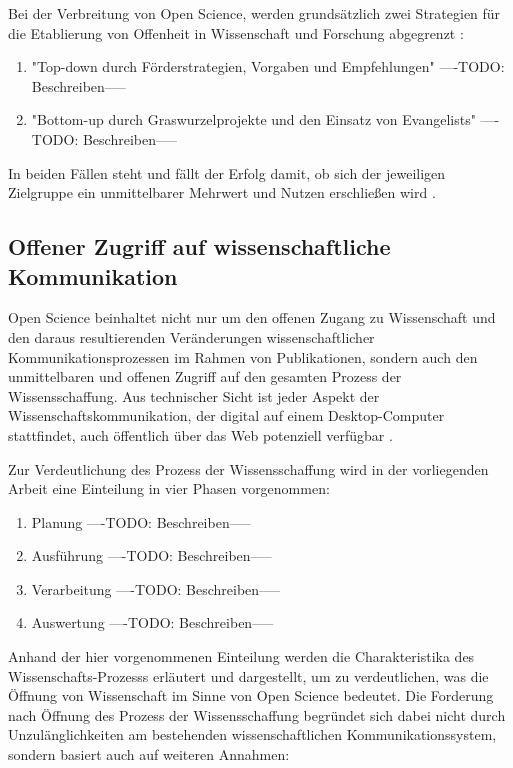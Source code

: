 Bei der Verbreitung von Open Science, werden grundsätzlich zwei Strategien für die Etablierung von Offenheit in Wissenschaft und Forschung abgegrenzt \cite{schulze_2013_open}: 
\begin{enumerate}
\item "Top-down durch Förderstrategien, Vorgaben und Empfehlungen"
----TODO: Beschreiben-----
\item "Bottom-up durch Graswurzelprojekte und den Einsatz von Evangelists"
----TODO: Beschreiben-----
\end{enumerate} 

In beiden Fällen steht und fällt der Erfolg damit, ob sich der jeweiligen Zielgruppe ein unmittelbarer Mehrwert und Nutzen erschließen wird \cite{schulze_2013_open}.

\subsection{Offener Zugriff auf wissenschaftliche Kommunikation}
Open Science beinhaltet nicht nur um den offenen Zugang zu Wissenschaft und den daraus resultierenden Veränderungen wissenschaftlicher Kommunikationsprozessen im Rahmen von Publikationen, sondern auch den unmittelbaren und offenen Zugriff auf den gesamten Prozess der Wissensschaffung. Aus technischer Sicht ist jeder Aspekt der Wissenschaftskommunikation, der digital auf einem Desktop-Computer stattfindet, auch öffentlich über das Web potenziell verfügbar \cite{mietchen2012wissenschaft}. 

Zur Verdeutlichung des Prozess der Wissensschaffung wird in der vorliegenden Arbeit eine Einteilung in vier Phasen vorgenommen:
\begin{enumerate}
\item Planung
----TODO: Beschreiben-----
\item Ausführung
----TODO: Beschreiben-----
\item Verarbeitung
----TODO: Beschreiben-----
\item Auswertung
----TODO: Beschreiben-----
\end{enumerate}

Anhand der hier vorgenommenen Einteilung werden die Charakteristika des Wissenschafts-Prozesss erläutert und dargestellt, um zu verdeutlichen, was die Öffnung von Wissenschaft im Sinne von Open Science bedeutet. Die Forderung nach Öffnung des Prozess der Wissensschaffung begründet sich dabei nicht  durch Unzulänglichkeiten am bestehenden wissenschaftlichen Kommunikationssystem, sondern basiert auch auf weiteren Annahmen:

